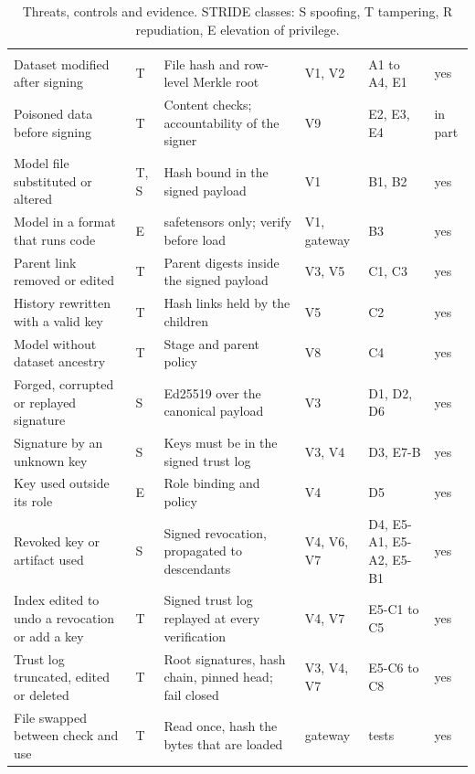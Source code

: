 {\tablefont\setlength{\tabcolsep}{4pt}
\begin{xltabular}{\textwidth}{P{4.25cm}P{0.9cm}P{3.9cm}P{1.25cm}P{1.75cm}L}
\caption{Threats, controls and evidence. STRIDE classes: S spoofing, T tampering, R repudiation, E elevation of privilege.}\label{tab:threats}\\
\toprule
\headrow{} &  &  &  &  &  \\
\midrule
\endfirsthead
\toprule
\headrow{} &  &  &  &  &  \\
\midrule
\endhead
\bottomrule
\endfoot
Dataset modified after signing & T & File hash and row-level Merkle root & V1, V2 & A1 to A4, E1 & yes \\
Poisoned data before signing & T & Content checks; accountability of the signer & V9 & E2, E3, E4 & in part \\
Model file substituted or altered & T, S & Hash bound in the signed payload & V1 & B1, B2 & yes \\
Model in a format that runs code & E & safetensors only; verify before load & V1, gateway & B3 & yes \\
Parent link removed or edited & T & Parent digests inside the signed payload & V3, V5 & C1, C3 & yes \\
History rewritten with a valid key & T & Hash links held by the children & V5 & C2 & yes \\
Model without dataset ancestry & T & Stage and parent policy & V8 & C4 & yes \\
Forged, corrupted or replayed signature & S & Ed25519 over the canonical payload & V3 & D1, D2, D6 & yes \\
Signature by an unknown key & S & Keys must be in the signed trust log & V3, V4 & D3, E7-B & yes \\
Key used outside its role & E & Role binding and policy & V4 & D5 & yes \\
Revoked key or artifact used & S & Signed revocation, propagated to descendants & V4, V6, V7 & D4, E5-A1, E5-A2, E5-B1 & yes \\
Index edited to undo a revocation or add a key & T & Signed trust log replayed at every verification & V4, V7 & E5-C1 to C5 & yes \\
Trust log truncated, edited or deleted & T & Root signatures, hash chain, pinned head; fail closed & V3, V4, V7 & E5-C6 to C8 & yes \\
File swapped between check and use & T & Read once, hash the bytes that are loaded & gateway & tests & yes \\

\end{xltabular}}
